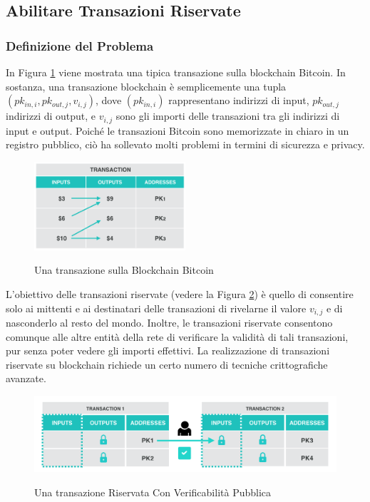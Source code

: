 \subsection{Abilitare Transazioni Riservate}

\subsubsection{Definizione del Problema}
In Figura \ref{fig:fig4} viene mostrata una tipica transazione sulla blockchain Bitcoin. In sostanza, una transazione blockchain è semplicemente una tupla $({pk_{in,i}, {pk_{out,j},{v_{i,j}}}})$, dove $({pk_{in,i}})$ rappresentano indirizzi di input, ${pk_{out,j}}$ indirizzi di output, e ${v_{i,j}}$ sono gli importi delle transazioni tra gli indirizzi di input e output. Poiché le transazioni Bitcoin sono memorizzate in chiaro in un registro pubblico, ciò ha sollevato molti problemi in termini di sicurezza e privacy.

\begin{figure}[ht]
	\centering
	\includegraphics[width=0.5\textwidth]{Figura4.png}
	\label{fig:fig4}
	\caption{Una transazione sulla Blockchain Bitcoin}
\end{figure}

L'obiettivo delle transazioni riservate (vedere la Figura \ref{fig:fig5}) è quello di consentire solo ai mittenti e ai destinatari delle transazioni di rivelarne il valore ${v_{i,j}}$ e di nasconderlo al resto del mondo. Inoltre, le transazioni riservate consentono comunque alle altre entità della rete di verificare la validità di tali transazioni, pur senza poter vedere gli importi effettivi. La realizzazione di transazioni riservate su blockchain richiede un certo numero di tecniche crittografiche avanzate.

\begin{figure}[ht]
	\includegraphics[width=\textwidth]{Figura5.png}
	\label{fig:fig5}
	\caption{Una transazione Riservata Con Verificabilità Pubblica}
\end{figure}

